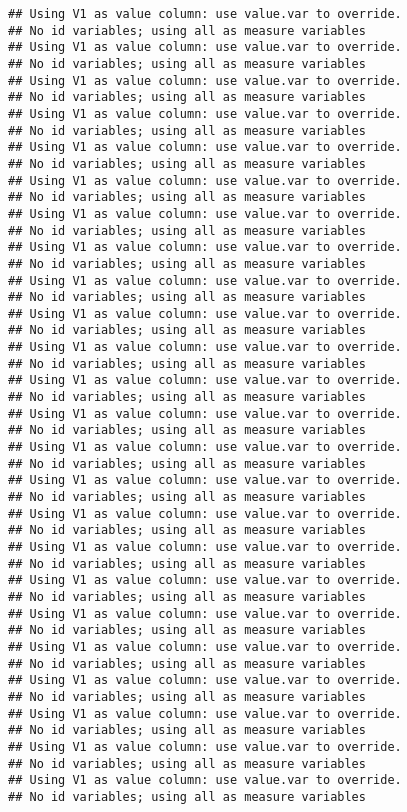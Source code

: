\documentclass[]{components/elsarticle}
\begin{document}
\begin{verbatim}
## Using V1 as value column: use value.var to override.
## No id variables; using all as measure variables
## Using V1 as value column: use value.var to override.
## No id variables; using all as measure variables
## Using V1 as value column: use value.var to override.
## No id variables; using all as measure variables
## Using V1 as value column: use value.var to override.
## No id variables; using all as measure variables
## Using V1 as value column: use value.var to override.
## No id variables; using all as measure variables
## Using V1 as value column: use value.var to override.
## No id variables; using all as measure variables
## Using V1 as value column: use value.var to override.
## No id variables; using all as measure variables
## Using V1 as value column: use value.var to override.
## No id variables; using all as measure variables
## Using V1 as value column: use value.var to override.
## No id variables; using all as measure variables
## Using V1 as value column: use value.var to override.
## No id variables; using all as measure variables
## Using V1 as value column: use value.var to override.
## No id variables; using all as measure variables
## Using V1 as value column: use value.var to override.
## No id variables; using all as measure variables
## Using V1 as value column: use value.var to override.
## No id variables; using all as measure variables
## Using V1 as value column: use value.var to override.
## No id variables; using all as measure variables
## Using V1 as value column: use value.var to override.
## No id variables; using all as measure variables
## Using V1 as value column: use value.var to override.
## No id variables; using all as measure variables
## Using V1 as value column: use value.var to override.
## No id variables; using all as measure variables
## Using V1 as value column: use value.var to override.
## No id variables; using all as measure variables
## Using V1 as value column: use value.var to override.
## No id variables; using all as measure variables
## Using V1 as value column: use value.var to override.
## No id variables; using all as measure variables
## Using V1 as value column: use value.var to override.
## No id variables; using all as measure variables
## Using V1 as value column: use value.var to override.
## No id variables; using all as measure variables
## Using V1 as value column: use value.var to override.
## No id variables; using all as measure variables
## Using V1 as value column: use value.var to override.
## No id variables; using all as measure variables
\end{verbatim}
\end{document}
